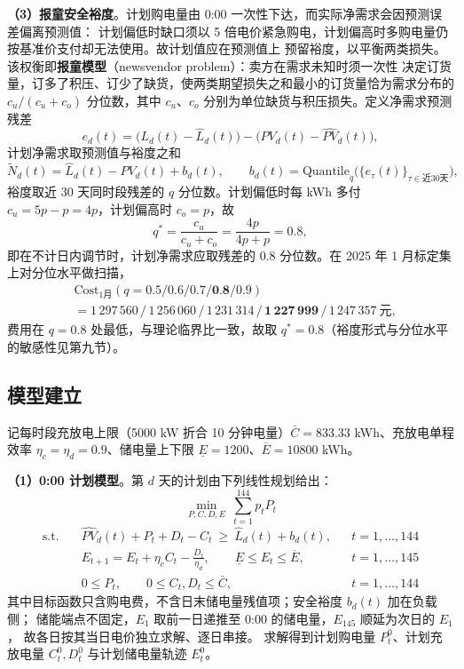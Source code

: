 \documentclass[withoutpreface,bwprint]{cumcmthesis}
\begin{document}
\textbf{（3）报童安全裕度}。计划购电量由 0:00 一次性下达，而实际净需求会因预测误差偏离预测值：
计划偏低时缺口须以 5 倍电价紧急购电，计划偏高时多购电量仍按基准价支付却无法使用。故计划值应在预测值上
预留裕度，以平衡两类损失。该权衡即\textbf{报童模型}（newsvendor problem）：卖方在需求未知时须一次性
决定订货量，订多了积压、订少了缺货，使两类期望损失之和最小的订货量恰为需求分布的
$c_u/(c_u+c_o)$ 分位数，其中 $c_u$、$c_o$ 分别为单位缺货与积压损失。定义净需求预测残差
\begin{equation}
e_d(t)=\big(L_d(t)-\hat L_d(t)\big)-\big(PV_d(t)-\widehat{PV}_d(t)\big),
\label{eq:resid}
\end{equation}
计划净需求取预测值与裕度之和
\begin{equation}
\tilde N_d(t)=\hat L_d(t)-\widehat{PV}_d(t)+b_d(t),\qquad
b_d(t)=\mathrm{Quantile}_{q}\big(\{e_\tau(t)\}_{\tau\in\text{近30天}}\big),
\label{eq:buffer}
\end{equation}
裕度取近 30 天同时段残差的 $q$ 分位数。计划偏低时每 kWh 多付 $c_u=5p-p=4p$，计划偏高时 $c_o=p$，故
\begin{equation}
q^*=\frac{c_u}{c_u+c_o}=\frac{4p}{4p+p}=0.8 ,
\label{eq:newsboy}
\end{equation}
即在不计日内调节时，计划净需求应取残差的 0.8 分位数。在 2025 年 1 月标定集上对分位水平做扫描，
\begin{equation}
\begin{aligned}
&\mathrm{Cost}_{1\text{月}}(q=0.5/0.6/0.7/\textbf{0.8}/0.9)\\
&=1\,297\,560\,/\,1\,256\,060\,/\,1\,231\,314\,/\,\bm{1\,227\,999}\,/\,1\,247\,357\ \text{元},
\end{aligned}
\label{eq:qtune}
\end{equation}
费用在 $q=0.8$ 处最低，与理论临界比一致，故取 $q^*=0.8$（裕度形式与分位水平的敏感性见第九节）。

\subsection{模型建立}

记每时段充放电上限（5000 kW 折合 10 分钟电量）$\bar C=833.33$ kWh、充放电单程效率
$\eta_c=\eta_d=0.9$、储电量上下限 $\underline{E}=1200$、$\overline{E}=10800$ kWh。

\textbf{（1）0:00 计划模型}。第 $d$ 天的计划由下列线性规划给出：
\begin{equation}
\min_{P,C,D,E}\ \sum_{t=1}^{144}p_tP_t
\label{eq:q2obj}
\end{equation}
\begin{align}
\text{s.t.}\quad
& \widehat{PV}_d(t)+P_t+D_t-C_t\ \ge\ \hat L_d(t)+b_d(t), && t=1,\dots,144 \label{eq:q2bal}\\
& E_{t+1}=E_t+\eta_cC_t-\frac{D_t}{\eta_d},\qquad \underline{E}\le E_t\le\overline{E}, && t=1,\dots,145 \label{eq:q2soc}\\
& 0\le P_t,\qquad 0\le C_t,D_t\le\bar C, && t=1,\dots,144 \label{eq:q2cap}
\end{align}
其中目标函数只含购电费，不含日末储电量残值项；安全裕度 $b_d(t)$ 加在负载侧；
储能端点不固定，$E_1$ 取前一日递推至 0:00 的储电量，$E_{145}$ 顺延为次日的 $E_1$，
故各日按其当日电价独立求解、逐日串接。
求解得到计划购电量 $P^0_t$、计划充放电量 $C^0_t,D^0_t$ 与计划储电量轨迹 $E^0_t$。
\end{document}
